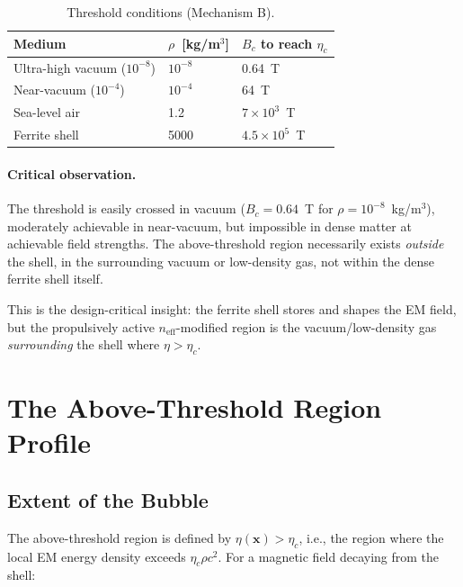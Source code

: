 \documentclass[12pt,aps,prd,superscriptaddress,nofootinbib,longbibliography]{revtex4-2}
\newcommand{\etac}{\eta_c}
\begin{document}
\begin{table}[h]
\caption{Threshold conditions (Mechanism B).}
\begin{ruledtabular}
\begin{tabular}{lll}
Medium & $\rho$~[kg/m$^3$] & $B_c$ to reach $\etac$ \\
\hline
Ultra-high vacuum ($10^{-8}$) & $10^{-8}$ & 0.64~T \\
Near-vacuum ($10^{-4}$) & $10^{-4}$ & 64~T \\
Sea-level air & 1.2 & $7 \times 10^3$~T \\
Ferrite shell & 5000 & $4.5 \times 10^5$~T \\
\end{tabular}
\end{ruledtabular}
\end{table}

\paragraph{Critical observation.}
The threshold is easily crossed in vacuum ($B_c = 0.64$~T for
$\rho = 10^{-8}$~kg/m$^3$), moderately achievable in near-vacuum,
but impossible in dense matter at achievable field strengths.  The
above-threshold region necessarily exists \emph{outside} the shell,
in the surrounding vacuum or low-density gas, not within the dense
ferrite shell itself.

This is the design-critical insight: the ferrite shell stores and shapes
the EM field, but the propulsively active $n_{\mathrm{eff}}$-modified
region is the vacuum/low-density gas \emph{surrounding} the shell where
$\eta > \etac$.


\section{The Above-Threshold Region Profile}\label{sec:bubble-profile}

\subsection{Extent of the Bubble}

The above-threshold region is defined by $\eta(\mathbf{x}) > \etac$,
i.e., the region where the local EM energy density exceeds
$\etac \rho c^2$.  For a magnetic field decaying from the shell:
\end{document}
